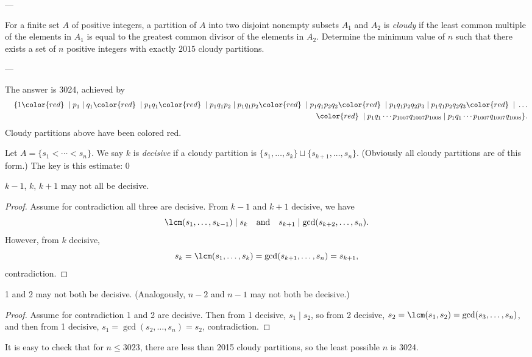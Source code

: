 
---

For a finite set $A$ of positive integers, a partition of $A$ into two disjoint nonempty subsets $A_1$ and $A_2$ is \emph{cloudy} if the least common multiple of the elements in $A_1$ is equal to the greatest common divisor of the elements in $A_2$. Determine the minimum value of $n$ such that there exists a set of $n$ positive integers with exactly $2015$ cloudy partitions.

---

The answer is 3024, achieved by
\begin{align*}
    &&\{1{\color{red}\;\mid\;}p_1\mid q_1{\color{red}\;\mid\;}p_1q_1{\color{red}\;\mid\;}p_1q_1p_2\mid p_1q_1p_2{\color{red}\;\mid\;}p_1q_1p_2q_2{\color{red}\;\mid\;}p_1q_1p_2q_2p_3\mid p_1q_1p_2q_2q_3{\color{red}\;\mid\;}\ldots\\
    &&{\color{red}\;\mid\;}p_1q_1\cdots p_{1007}q_{1007}p_{1008}\mid p_1q_1\cdots p_{1007}q_{1007}q_{1008}\}.
\end{align*}
Cloudy partitions above have been colored red.

Let $A=\{s_1<\cdots<s_n\}$. We say $k$ is \emph{decisive} if a cloudy partition is $\{s_1,\ldots,s_k\}\sqcup\{s_{k+1},\ldots,s_n\}$. (Obviously all cloudy partitions are of this form.) The key is this estimate:
\setcounter{claim}0
\begin{claim}
    $k-1$, $k$, $k+1$ may not all be decisive.
\end{claim}
\begin{proof}
    Assume for contradiction all three are decisive. From $k-1$ and $k+1$ decisive,
    we have
    \[\lcm(s_1,\ldots,s_{k-1})\mid s_k\quad\text{and}\quad s_{k+1}\mid\gcd(s_{k+2},\ldots,s_n).\]
    However, from $k$ decisive,
    \[s_k=\lcm(s_1,\ldots,s_k)=\gcd(s_{k+1},\ldots,s_n)=s_{k+1},\]
    contradiction.
\end{proof}
\begin{claim}
    1 and 2 may not both be decisive. (Analogously, $n-2$ and $n-1$ may not both be decisive.)
\end{claim}
\begin{proof}
    Assume for contradiction 1 and 2 are decisive. Then from 1 decisive, $s_1\mid s_2$, so from 2 decisive, $s_2=\lcm(s_1,s_2)=\gcd(s_3,\ldots,s_n)$, and then from 1 decisive, $s_1=\gcd(s_2,\ldots,s_n)=s_2$, contradiction.
\end{proof}

It is easy to check that for $n\le3023$, there are less than 2015 cloudy partitions, so the least possible $n$ is 3024.
